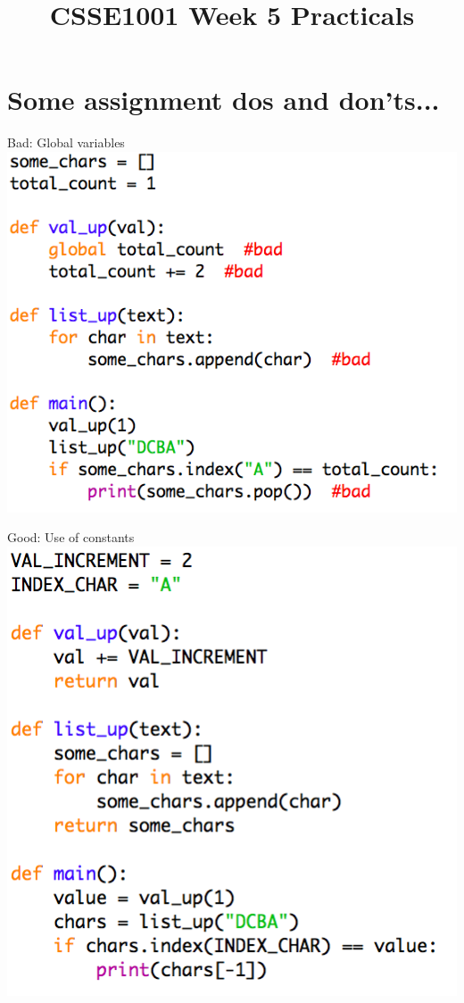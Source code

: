 \documentclass[week2]{csse1001}
\title{CSSE1001 Week 5 Practicals}
\begin{document}
\begin{frame} 
\maketitle
\end{frame}

\section{Some assignment dos and don'ts...}

\begin{topic}{Bad: Global variables}
\includegraphics[height=\textheight]{bad_python/globals}
\end{topic}

\begin{topic}{Good: Use of constants}
\includegraphics[height=\textheight]{bad_python/constants}
\end{topic}
\end{document}

